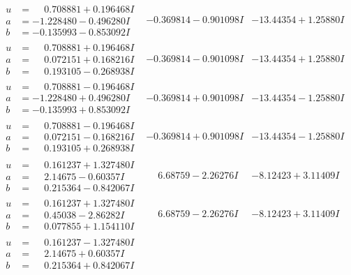 \documentclass[1p]{elsarticle_modified}
\theoremstyle{definition}
\begin{document}
$$\begin{array}{c|c|c}
\begin{aligned}
u &= \phantom{-}0.708881 + 0.196468 I \\
a &= -1.228480 - 0.496280 I \\
b &= -0.135993 - 0.853092 I\end{aligned}
 & -0.369814 - 0.901098 I & -13.44354 + 1.25880 I \\ \hline\begin{aligned}
u &= \phantom{-}0.708881 + 0.196468 I \\
a &= \phantom{-}0.072151 + 0.168216 I \\
b &= \phantom{-}0.193105 - 0.268938 I\end{aligned}
 & -0.369814 - 0.901098 I & -13.44354 + 1.25880 I \\ \hline\begin{aligned}
u &= \phantom{-}0.708881 - 0.196468 I \\
a &= -1.228480 + 0.496280 I \\
b &= -0.135993 + 0.853092 I\end{aligned}
 & -0.369814 + 0.901098 I & -13.44354 - 1.25880 I \\ \hline\begin{aligned}
u &= \phantom{-}0.708881 - 0.196468 I \\
a &= \phantom{-}0.072151 - 0.168216 I \\
b &= \phantom{-}0.193105 + 0.268938 I\end{aligned}
 & -0.369814 + 0.901098 I & -13.44354 - 1.25880 I \\ \hline\begin{aligned}
u &= \phantom{-}0.161237 + 1.327480 I \\
a &= \phantom{-}2.14675 - 0.60357 I \\
b &= \phantom{-}0.215364 - 0.842067 I\end{aligned}
 & \phantom{-}6.68759 - 2.26276 I & -8.12423 + 3.11409 I \\ \hline\begin{aligned}
u &= \phantom{-}0.161237 + 1.327480 I \\
a &= \phantom{-}0.45038 - 2.86282 I \\
b &= \phantom{-}0.077855 + 1.154110 I\end{aligned}
 & \phantom{-}6.68759 - 2.26276 I & -8.12423 + 3.11409 I \\ \hline\begin{aligned}
u &= \phantom{-}0.161237 - 1.327480 I \\
a &= \phantom{-}2.14675 + 0.60357 I \\
b &= \phantom{-}0.215364 + 0.842067 I\end{aligned}

\end{array}$$
\end{document}
